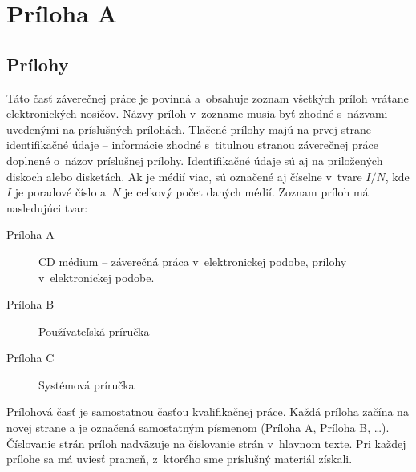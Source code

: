 \section*{Pr\'iloha A}
\subsection*{Pr\'ilohy}

Táto časť\/ záverečnej práce je povinná a~obsahuje zoznam všetkých
príloh vrátane elektronických nosičov. Názvy príloh v~zozname musia
byť\/ zhodné s~názvami uvedenými na príslušných prílohách. Tlačené
prílohy majú na prvej strane identifikačné údaje -- informácie zhodné
s~titulnou stranou záverečnej práce doplnené o~názov príslušnej
prílohy. Identifikačné údaje sú aj na priložených diskoch alebo
disketách. Ak je médií viac, sú označené aj číselne v~tvare $I/N$, kde
$I$ je poradové číslo a~$N$ je celkový počet daných médií. Zoznam
príloh má nasledujúci tvar:
\begin{description}
\item[Príloha A] CD médium -- záverečná práca v~elektronickej podobe,
prílohy v~elektronickej podobe.
\item[Príloha B] Používateľská príručka
\item[Príloha C] Systémová príručka
\end{description}
Prílohová časť\/ je samostatnou časťou kvalifikačnej práce. Každá
príloha začína na novej strane a je označená samostatným písmenom
(Príloha A, Príloha B, \dots). Číslovanie strán príloh nadväzuje na
číslovanie strán v~hlavnom texte. Pri každej prílohe sa má uviesť\/
prameň, z~ktorého sme príslušný materiál získali.
